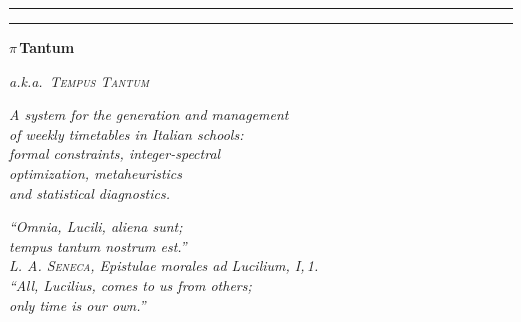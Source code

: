 %



\frontmatter

\begin{titlepage}
\thispagestyle{empty}
\centering
\vspace*{1.2cm}

\rule{0.78\textwidth}{1.2pt}\par
\vspace{2pt}
\rule{0.78\textwidth}{0.4pt}

\vspace{0.9cm}

{\fontsize{56}{60}\selectfont\rmfamily\bfseries\color{cIndaco}$\pi$\,Tantum\par}
\vspace{0.4cm}
{\Large\rmfamily\itshape\color{cInk} a.k.a.\ \textsc{Tempus Tantum}\par}

\vspace{0.7cm}
{\Large\color{cIndaco}\decofourleft\enskip\aldineleft\enskip\aldineright\enskip\decofourright\par}

\vspace{0.8cm}

\begin{minipage}{0.85\textwidth}
\centering\rmfamily\itshape\Large
A system for the generation and management\\
of weekly timetables in Italian schools:\\[0.3em]
\upshape\large\rmfamily
formal constraints, integer-spectral\\
optimization, metaheuristics\\
and statistical diagnostics.
\end{minipage}\par

\vspace{1.0cm}

\begin{minipage}{0.78\textwidth}
\centering
\rmfamily\itshape\color{cSiena}
``Omnia, Lucili, aliena sunt;\\ tempus tantum nostrum est.''\\[0.4em]
\upshape\small\color{cInk}\textsc{L. A. Seneca},
\emph{Epistulae morales ad Lucilium}, I,\,1.\\[0.2em]
\itshape\footnotesize ``All, Lucilius, comes to us from others;\\
only time is our own.''
\end{minipage}


\end{titlepage}
